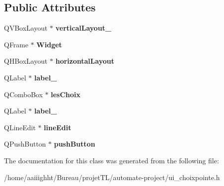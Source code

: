 \subsection*{Public Attributes}
\begin{DoxyCompactItemize}
\item 
\hypertarget{class_ui__choix_pointe_a226fc4022f79960aae1ebea672c9bc7d}{Q\-V\-Box\-Layout $\ast$ {\bfseries vertical\-Layout\-\_}}\label{class_ui__choix_pointe_a226fc4022f79960aae1ebea672c9bc7d}

\item 
\hypertarget{class_ui__choix_pointe_ad66e9f3539981707ca70a32d850bec0c}{Q\-Frame $\ast$ {\bfseries Widget}}\label{class_ui__choix_pointe_ad66e9f3539981707ca70a32d850bec0c}

\item 
\hypertarget{class_ui__choix_pointe_ac9f65cb0e44cd91406847d94fa67137e}{Q\-H\-Box\-Layout $\ast$ {\bfseries horizontal\-Layout}}\label{class_ui__choix_pointe_ac9f65cb0e44cd91406847d94fa67137e}

\item 
\hypertarget{class_ui__choix_pointe_a5e603feb22929b35ea2822f8d4d013b5}{Q\-Label $\ast$ {\bfseries label\-\_}}\label{class_ui__choix_pointe_a5e603feb22929b35ea2822f8d4d013b5}

\item 
\hypertarget{class_ui__choix_pointe_ae267664cffc2140c154a4137ecdf012d}{Q\-Combo\-Box $\ast$ {\bfseries les\-Choix}}\label{class_ui__choix_pointe_ae267664cffc2140c154a4137ecdf012d}

\item 
\hypertarget{class_ui__choix_pointe_a80c62d4b4e23a4727ac5e233f9dc8e59}{Q\-Label $\ast$ {\bfseries label\-\_}}\label{class_ui__choix_pointe_a80c62d4b4e23a4727ac5e233f9dc8e59}

\item 
\hypertarget{class_ui__choix_pointe_a5cdc7c23b7939b46d87464ac59d6162a}{Q\-Line\-Edit $\ast$ {\bfseries line\-Edit}}\label{class_ui__choix_pointe_a5cdc7c23b7939b46d87464ac59d6162a}

\item 
\hypertarget{class_ui__choix_pointe_a762ac6f369982bd3e2972d88d7f92118}{Q\-Push\-Button $\ast$ {\bfseries push\-Button}}\label{class_ui__choix_pointe_a762ac6f369982bd3e2972d88d7f92118}

\end{DoxyCompactItemize}


The documentation for this class was generated from the following file\-:\begin{DoxyCompactItemize}
\item 
/home/aaiiighht/\-Bureau/projet\-T\-L/automate-\/project/ui\-\_\-choixpointe.\-h\end{DoxyCompactItemize}
